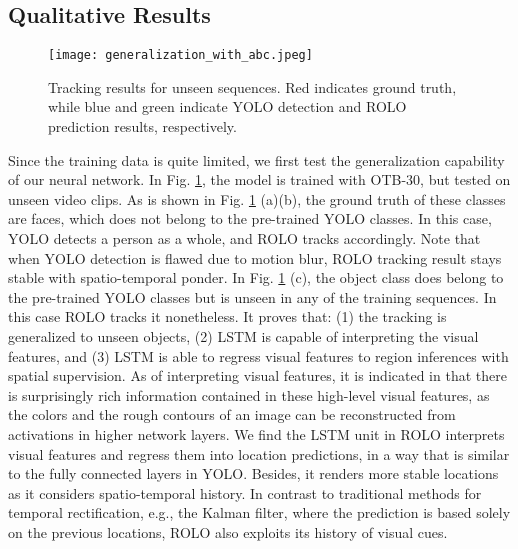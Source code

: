 \documentclass{article}
\begin{document}
\subsection{Qualitative Results}
\begin{figure}[h] %
	\tiny
	\captionsetup{justification=centering}
	\texttt{[image: generalization\_with\_abc.jpeg]}
	\caption{Tracking results for unseen sequences. Red indicates ground truth, while blue and green indicate YOLO detection and ROLO prediction results, respectively.}
	\label{fig-Generalization}
\end{figure}

Since the training data is quite limited, we first test the generalization capability of our neural network.
In Fig. \ref{fig-Generalization}, the model is trained with OTB-30, but tested on unseen video clips. As is shown in Fig. \ref{fig-Generalization} (a)(b), the ground truth of these classes are faces, which does not belong to the pre-trained YOLO classes. In this case, YOLO detects a person as a whole, and ROLO tracks accordingly. Note that when YOLO detection is flawed due to motion blur, ROLO tracking result stays stable with spatio-temporal ponder. In Fig. \ref{fig-Generalization} (c), the object class does belong to the pre-trained YOLO classes but is unseen in any of the training sequences. In this case ROLO tracks it nonetheless.
It proves that: (1) the tracking is generalized to unseen objects, (2) LSTM is capable of interpreting the visual features, and (3) LSTM is able to regress visual features to region inferences with spatial supervision. 
As of interpreting visual features, it is indicated in \citep{dosovitskiy2015inverting} that there is surprisingly rich information contained in these high-level visual features, as the colors and the rough contours of an image can be reconstructed from activations in higher network layers. %
We find the LSTM unit in ROLO interprets visual features and regress them into location predictions, in a way that is similar to the fully connected layers in YOLO. Besides, it renders more stable locations as it considers spatio-temporal history. In contrast to traditional methods for temporal rectification, e.g., the Kalman filter, where the prediction is based solely on the previous locations, ROLO also exploits its history of visual cues. 
\end{document}
